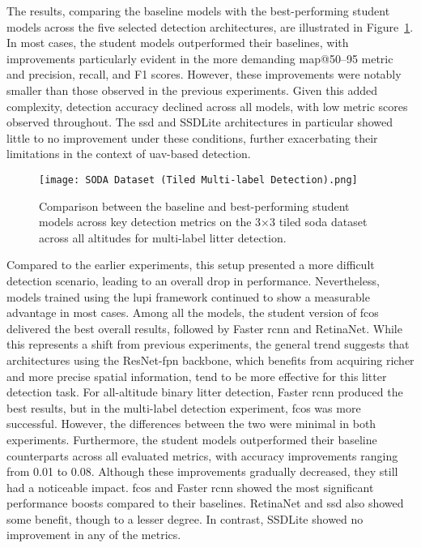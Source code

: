 The results, comparing the baseline models with the best-performing student models across the five selected detection architectures, are illustrated in Figure~\ref{fig:soda_tiled_multi_bar}. In most cases, the student models outperformed their baselines, with improvements particularly evident in the more demanding \gls{map}@50–95 metric and precision, recall, and F1 scores. However, these improvements were notably smaller than those observed in the previous experiments. Given this added complexity, detection accuracy declined across all models, with low metric scores observed throughout. The \gls{ssd} and SSDLite architectures in particular showed little to no improvement under these conditions, further exacerbating their limitations in the context of \gls{uav}-based detection.

\begin{figure}[!ht]
    \centering
    \texttt{[image: SODA Dataset (Tiled Multi-label Detection).png]}
    \caption{Comparison between the baseline and best-performing student models across key detection metrics on the 3$\times$3 tiled \gls{soda} dataset across all altitudes for multi-label litter detection.}
    \label{fig:soda_tiled_multi_bar}
\end{figure}

Compared to the earlier experiments, this setup presented a more difficult detection scenario, leading to an overall drop in performance. Nevertheless, models trained using the \gls{lupi} framework continued to show a measurable advantage in most cases.
Among all the models, the student version of \gls{fcos} delivered the best overall results, followed by Faster \gls{rcnn} and RetinaNet. While this represents a shift from previous experiments, the general trend suggests that architectures using the ResNet-\gls{fpn} backbone, which benefits from acquiring richer and more precise spatial information, tend to be more effective for this litter detection task. For all-altitude binary litter detection, Faster \gls{rcnn} produced the best results, but in the multi-label detection experiment, \gls{fcos} was more successful. However, the differences between the two were minimal in both experiments.
Furthermore, the student models outperformed their baseline counterparts across all evaluated metrics, with accuracy improvements ranging from 0.01 to 0.08. Although these improvements gradually decreased, they still had a noticeable impact. \gls{fcos} and Faster \gls{rcnn} showed the most significant performance boosts compared to their baselines. RetinaNet and \gls{ssd} also showed some benefit, though to a lesser degree. In contrast, SSDLite showed no improvement in any of the metrics.

